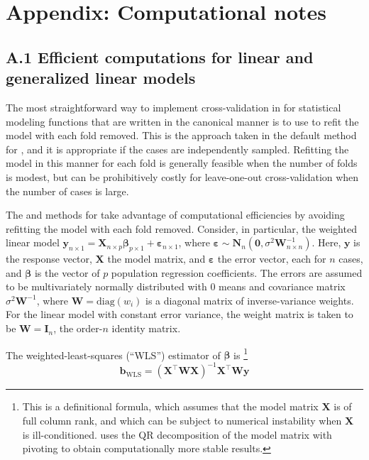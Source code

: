 \documentclass[
]{jss}
\begin{document}
\section*{Appendix: Computational
notes}\label{appendix-computational-notes}

\subsection*{A.1 Efficient computations for linear and generalized
linear
models}\label{a.1-efficient-computations-for-linear-and-generalized-linear-models}

The most straightforward way to implement cross-validation in
 for statistical modeling functions that are written in the
canonical manner is to use  to refit the model with each
fold removed. This is the approach taken in the default method for
, and it is appropriate if the cases are independently
sampled. Refitting the model in this manner for each fold is generally
feasible when the number of folds is modest, but can be prohibitively
costly for leave-one-out cross-validation when the number of cases is
large.

The  and  methods for  take advantage
of computational efficiencies by avoiding refitting the model with each
fold removed. Consider, in particular, the weighted linear model
\(\mathbf{y}_{n \times 1} = \mathbf{X}_{n \times p}\boldsymbol{\beta}_{p \times 1} + \boldsymbol{\varepsilon}_{n \times 1}\),
where
\(\boldsymbol{\varepsilon} \sim \mathbf{N}_n \left(\mathbf{0}, \sigma^2 \mathbf{W}^{-1}_{n \times n}\right)\).
Here, \(\mathbf{y}\) is the response vector, \(\mathbf{X}\) the model
matrix, and \(\boldsymbol{\varepsilon}\) the error vector, each for
\(n\) cases, and \(\boldsymbol{\beta}\) is the vector of \(p\)
population regression coefficients. The errors are assumed to be
multivariately normally distributed with 0 means and covariance matrix
\(\sigma^2 \mathbf{W}^{-1}\), where \(\mathbf{W} = \mathrm{diag}(w_i)\)
is a diagonal matrix of inverse-variance weights. For the linear model
with constant error variance, the weight matrix is taken to be
\(\mathbf{W} = \mathbf{I}_n\), the order-\(n\) identity matrix.

The weighted-least-squares (``WLS'') estimator of \(\boldsymbol{\beta}\)
is \citep[see, e.g.,][Sec.~12.2.2]{Fox:2016} \footnote{This is a
  definitional formula, which assumes that the model matrix
  \(\mathbf{X}\) is of full column rank, and which can be subject to
  numerical instability when \(\mathbf{X}\) is ill-conditioned.
   uses the QR decomposition of the model matrix with
  pivoting to obtain computationally more stable results.} \[
\mathbf{b}_{\mathrm{WLS}} = \left( \mathbf{X}^\top \mathbf{W} \mathbf{X} \right)^{-1}
  \mathbf{X}^\top \mathbf{W} \mathbf{y}
\]
\end{document}
